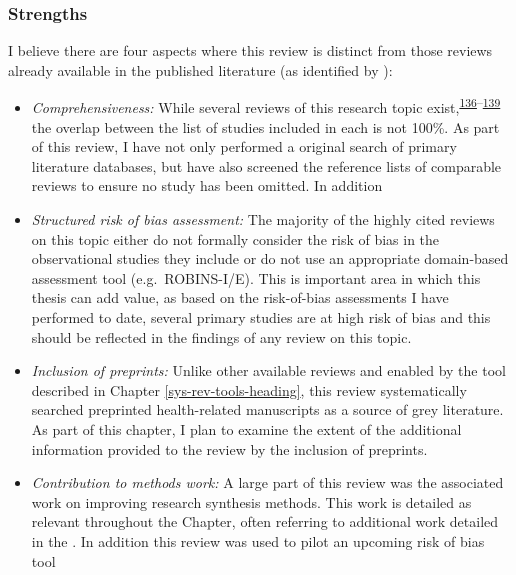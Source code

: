 \documentclass[a4paper, twoside]{templates/ociamthesis}
\providecommand{\tightlist}{%
  \setlength{\itemsep}{0pt}\setlength{\parskip}{0pt}}
\begin{document}
\hypertarget{strengths}{%
\subsubsection{Strengths}\label{strengths}}

I believe there are four aspects where this review is distinct from those reviews already available in the published literature (as identified by ):

\begin{itemize}
\item
  \emph{Comprehensiveness:} While several reviews of this research topic exist,\textsuperscript{\protect\hyperlink{ref-chu2018}{136}--\protect\hyperlink{ref-poly2020}{139}} the overlap between the list of studies included in each is not 100\%. As part of this review, I have not only performed a original search of primary literature databases, but have also screened the reference lists of comparable reviews to ensure no study has been omitted. In addition
\item
  \emph{Structured risk of bias assessment:} The majority of the highly cited reviews on this topic either do not formally consider the risk of bias in the observational studies they include or do not use an appropriate domain-based assessment tool (e.g.~ROBINS-I/E). This is important area in which this thesis can add value, as based on the risk-of-bias assessments I have performed to date, several primary studies are at high risk of bias and this should be reflected in the findings of any review on this topic.
\item
  \emph{Inclusion of preprints:} Unlike other available reviews and enabled by the tool described in Chapter \ref{sys-rev-tools-heading}, this review systematically searched preprinted health-related manuscripts as a source of grey literature. As part of this chapter, I plan to examine the extent of the additional information provided to the review by the inclusion of preprints.
\end{itemize}

\begin{itemize}
\tightlist
\item
  \emph{Contribution to methods work:} A large part of this review was the associated work on improving research synthesis methods. This work is detailed as relevant throughout the Chapter, often referring to additional work detailed in the . In addition this review was used to pilot an upcoming risk of bias tool
\end{itemize}
\end{document}
